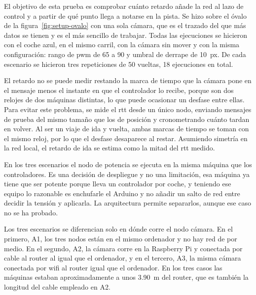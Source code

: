 El objetivo de esta prueba es comprobar cuánto retardo añade la red al lazo de control y a partir de qué punto llega a notarse en la pista. Se hizo sobre el óvalo de la figura~\ref{fig:setup-ovalo} con una sola cámara, que es el trazado del que más datos se tienen y es el más sencillo de trabajar. 
%
Todas las ejecuciones se hicieron con el coche azul, en el mismo carril, con la cámara sin mover y con la misma configuración: rango de \gls{pwm} de 65 a 90 y umbral de derrape de 10~px. De cada escenario se hicieron tres repeticiones de 50 vueltas, 18 ejecuciones en total.

El retardo no se puede medir restando la marca de tiempo que la cámara pone en el mensaje menos el instante en que el controlador lo recibe, porque son dos relojes de dos máquinas distintas, lo que puede ocasionar un desfase entre ellas. Para evitar este problema, se mide el \gls{rtt} desde un único nodo, enviando mensajes de prueba del mismo tamaño que los de posición y cronometrando cuánto tardan en volver. Al ser un viaje de ida y vuelta, ambas marcas de tiempo se toman con el mismo reloj, por lo que el desfase desaparece al restar. Asumiendo simetría en la red local, el retardo de ida se estima como la mitad del \gls{rtt} medido.

En los tres escenarios el nodo de potencia se ejecuta en la misma máquina que los controladores. Es una decisión de despliegue y no una limitación, esa máquina ya tiene que ser potente porque lleva un controlador por coche, y teniendo ese equipo lo razonable es enchufarle el Arduino y no añadir un salto de red entre decidir la tensión y aplicarla. La arquitectura permite separarlos, aunque ese caso no se ha probado.

Los tres escenarios se diferencian solo en dónde corre el nodo cámara. En el primero, A1, los tres nodos están en el mismo ordenador y no hay red de por medio. En el segundo, A2, la cámara corre en la Raspberry Pi y conectada por cable al router al igual que el ordenador, y en el tercero, A3, la misma cámara conectada por wifi al router igual que el ordenador. En los tres casos las máquinas estaban aproximadamente a unos \qty{3,90}{\metre} del router, que es también la longitud del cable empleado en A2. %

